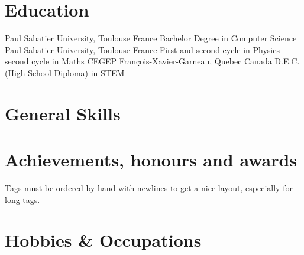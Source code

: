 \documentclass[%
               doublesided,
               paper=a4,
               fontsize=10pt
              ]{my-resume}
\begin{document}
{    \section[\faMortarBoard]{Education}
        {Paul Sabatier University, Toulouse France}
        {Bachelor Degree in Computer Science}
        {}
        {Paul Sabatier University, Toulouse France}
        {First and second cycle in Physics \\ second cycle in Maths}
        {}
        {CEGEP François-Xavier-Garneau, Quebec Canada}
        {D.E.C. (High School Diploma) in STEM}
        {}

    \section{General Skills}
    \smallskip %
    
    \section{Achievements, honours and awards}
    
    \medskip
    Tags must be ordered by hand with newlines to get a nice layout, especially for long tags.
    
    \section{Hobbies \& Occupations}
}
\makebody
\clearpage
\end{document}
